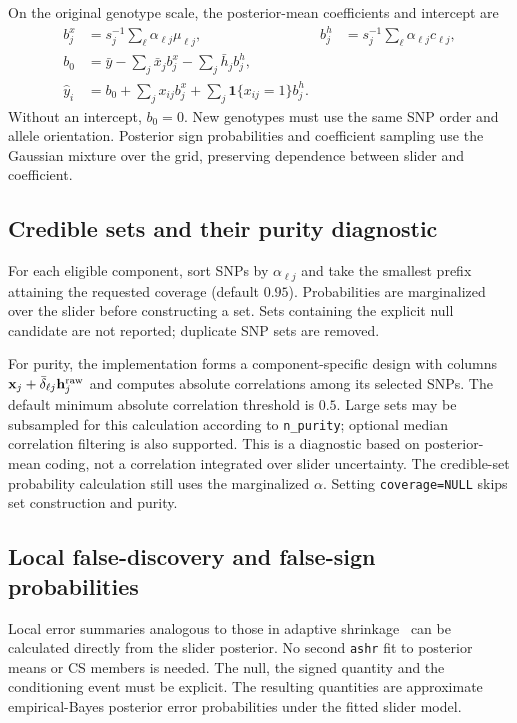 \documentclass[11pt]{article}
\newcommand{\ind}{\mathbf 1}
\begin{document}
On the original genotype scale, the posterior-mean coefficients and
intercept are
\begin{align}
 b_j^x&=s_j^{-1}\sum_\ell\alpha_{\ell j}\mu_{\ell j},&
 b_j^h&=s_j^{-1}\sum_\ell\alpha_{\ell j}c_{\ell j},\nonumber\\
 b_0&=\bar y-\sum_j\bar x_j b_j^x-\sum_j\bar h_j b_j^h,\nonumber\\
 \widehat y_i&=b_0+\sum_jx_{ij}b_j^x+\sum_j\ind\{x_{ij}=1\}b_j^h.
 \label{eq:prediction}
\end{align}
Without an intercept, $b_0=0$. New genotypes must use the same SNP order
and allele orientation. Posterior sign probabilities and coefficient
sampling use the Gaussian mixture over the grid, preserving dependence
between slider and coefficient.

\subsection{Credible sets and their purity diagnostic}
For each eligible component, sort SNPs by $\alpha_{\ell j}$ and take the
smallest prefix attaining the requested coverage (default $0.95$).
Probabilities are marginalized over the slider before constructing a
set. Sets containing the explicit null candidate are not reported;
duplicate SNP sets are removed.

For purity, the implementation forms a component-specific design with
columns $\mathbf x_j+\bar\delta_{\ell j}\mathbf h_j^{\rm raw}$ and computes
absolute correlations among its selected SNPs. The default minimum
absolute correlation threshold is $0.5$. Large sets may be subsampled
for this calculation according to \texttt{n\_purity}; optional median
correlation filtering is also supported. This is a diagnostic based on
posterior-mean coding, not a correlation integrated over slider uncertainty.
The credible-set probability calculation still uses the marginalized
$\alpha$. Setting \texttt{coverage=NULL} skips set construction and purity.

\subsection{Local false-discovery and false-sign probabilities}
\label{sec:local-errors}
Local error summaries analogous to those in adaptive shrinkage~\cite{ashr}
can be calculated directly from the slider posterior. No second
\texttt{ashr} fit to posterior means or CS members is needed. The null,
the signed quantity and the conditioning event must be explicit.
The resulting quantities are approximate empirical-Bayes posterior error
probabilities under the fitted slider model.
\end{document}
